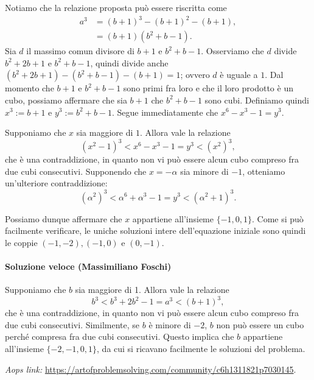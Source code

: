 \documentclass{article}
\begin{document}
Notiamo che la relazione proposta può essere riscritta come
\begin{align*}
	a^3 &= (b+1)^3-(b+1)^2-(b+1), \\
		 &= (b+1)(b^2+b-1).
\end{align*}
Sia $d$ il massimo comun divisore di $b+1$ e $b^2+b-1$.
Osserviamo che $d$ divide
$b^2+2b+1$ e $b^2+b-1$, quindi divide anche $(b^2+2b+1)-(b^2+b-1)-(b+1)=1$;
ovvero $d$ è uguale a $1$.
Dal momento che $b+1$ e $b^2+b-1$ sono primi fra loro e che il loro prodotto
è un cubo, possiamo affermare che sia $b+1$ che $b^2+b-1$ sono cubi.
Definiamo quindi
$x^3:=b+1$ e $y^3:=b^2+b-1$. Segue immediatamente che $x^6-x^3-1=y^3$.

Supponiamo che $x$ sia maggiore di $1$. Allora vale la relazione
\begin{equation*}
	(x^2-1)^3 < x^6-x^3-1=y^3 < (x^2)^3,
\end{equation*}
che è una contraddizione, in quanto non vi può essere alcun cubo compreso
fra due cubi consecutivi. Supponendo che $x=-\alpha$ sia
minore di $-1$, otteniamo un'ulteriore contraddizione:
\begin{equation*}
	(\alpha^2)^3 < \alpha^6 + \alpha^3 -1=y^3 < (\alpha^2+1)^3.
\end{equation*}

Possiamo dunque affermare che $x$ appartiene all'insieme $\{ -1,0,1 \}$.
Come si può facilmente verificare,
le uniche soluzioni intere dell'equazione iniziale sono quindi le coppie
$(-1,-2),(-1,0)$ e $(0,-1)$.


\paragraph{Soluzione veloce (Massimiliano Foschi)}

Supponiamo che $b$ sia maggiore di 1. Allora vale
la relazione
\begin{equation*}
	b^3<b^3+2b^2-1=a^3<(b+1)^3,
\end{equation*}
che è una contraddizione, in quanto non vi può essere alcun cubo
compreso fra due cubi consecutivi.
Similmente, se $b$ è minore di $-2$, $b$ non può essere un cubo
perché compresa fra due cubi consecutivi. Questo implica che $b$ appartiene
all'insieme $\{-2,-1,0,1 \}$, da cui si ricavano facilmente le soluzioni del
problema.

\vspace{0.5cm}
\textit{Aops link:}
\href{https://artofproblemsolving.com/community/c6h1311821p7030145}
{https://artofproblemsolving.com/community/c6h1311821p7030145}.
\end{document}
